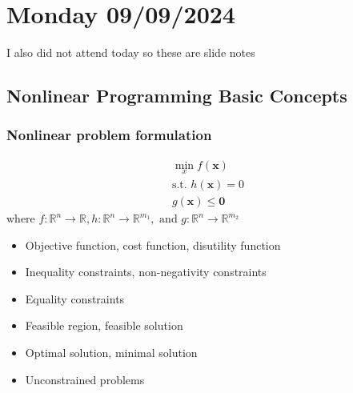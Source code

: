 \section{Monday 09/09/2024}
I also did not attend today so these are slide notes
\subsection{Nonlinear Programming Basic Concepts}
\subsubsection{Nonlinear problem formulation}
\begin{equation}
  \begin{aligned}
    \min_x f(\textbf{x}) \\
    \text{s.t. } h(\textbf{x}) = 0 \\
    g(\textbf{x}) \leq \textbf{0}
  \end{aligned}
\end{equation}
where $f : \mathbb{R}^n \to  \mathbb{R}, h : \mathbb{R}^n \to \mathbb{R}^{m_1}, \text{ and } g : \mathbb{R}^n \to \mathbb{R}^{m_2} $


\begin{itemize}
  \item Objective function, cost function, disutility function
  \item Inequality constraints, non-negativity constraints
  \item Equality constraints
  \item Feasible region, feasible solution
  \item Optimal solution, minimal solution
  \item Unconstrained problems
\end{itemize}

